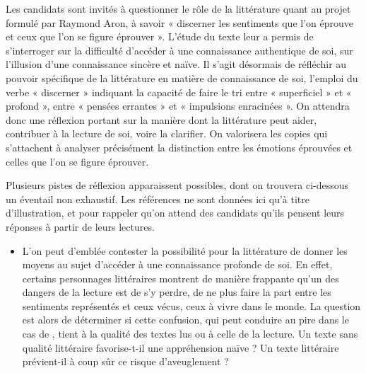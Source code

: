 		{Les candidats sont invités à questionner le rôle de la littérature quant au projet
formulé par Raymond Aron, à savoir « discerner les sentiments que l’on éprouve et
ceux que l’on se figure éprouver ». L’étude du texte leur a permis de s’interroger sur
la difficulté d’accéder à une connaissance authentique de soi, sur l’illusion d’une
connaissance sincère et naïve. Il s’agit désormais de réfléchir au pouvoir spécifique
de la littérature en matière de connaissance de soi, l’emploi du verbe « discerner »
indiquant la capacité de faire le tri entre « superficiel » et « profond », entre « pensées
errantes » et « impulsions enracinées ». On attendra donc une réflexion portant sur la
manière dont la littérature peut aider, contribuer à la lecture de soi, voire la clarifier. On
valorisera les copies qui s’attachent à analyser précisément la distinction entre les
émotions éprouvées et celles que l’on se figure éprouver.

Plusieurs pistes de réflexion apparaissent possibles, dont on trouvera ci-dessous un
éventail non exhaustif. Les références ne sont données ici qu’à titre d’illustration, et
pour rappeler qu’on attend des candidats qu’ils pensent leurs réponses à partir de leurs
lectures.

\begin{itemize}
\item L’on peut d’emblée contester la possibilité pour la littérature de donner les moyens
au sujet d’accéder à une connaissance profonde de soi. En effet, certains personnages
littéraires montrent de manière frappante qu’un des dangers de la lecture est de s’y
perdre, de ne plus faire la part entre les sentiments représentés et ceux vécus, ceux à
vivre dans le monde. La question est alors de déterminer si cette confusion, qui peut
conduire au pire dans le cas de , tient à la qualité des textes lus ou à celle de la lecture. Un texte sans qualité littéraire favorise-t-il une appréhension
naïve ? Un texte littéraire prévient-il à coup sûr ce risque d’aveuglement ?


\end{itemize}}
